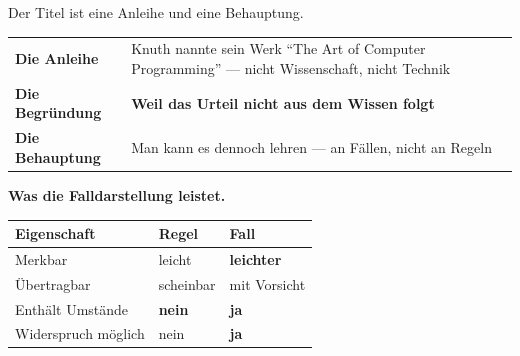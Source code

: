 \begin{geschichte}
Der Titel ist eine Anleihe und eine Behauptung.

\begin{center}
\renewcommand{\arraystretch}{1.5}
\begin{tabular}{@{}P{2.6cm}P{6.2cm}@{}}
\toprule
\textbf{Die Anleihe} & Knuth nannte sein Werk \enquote{The Art of Computer Programming} --- nicht Wissenschaft, nicht Technik\\
\textbf{Die Begründung} & \textbf{Weil das Urteil nicht aus dem Wissen folgt}\\
\textbf{Die Behauptung} & Man kann es dennoch lehren --- an Fällen, nicht an Regeln\\
\bottomrule
\end{tabular}
\end{center}

\begin{center}
\begin{minipage}{0.86\textwidth}
\end{minipage}
\end{center}

\textbf{Was die Falldarstellung leistet.}

\begin{center}
\renewcommand{\arraystretch}{1.5}
\begin{tabular}{@{}P{2.8cm}P{2.4cm}P{2.6cm}@{}}
\toprule
\textbf{Eigenschaft} & \textbf{Regel} & \textbf{Fall}\\
\midrule
Merkbar & \textcolor{gruen}{leicht} & \textcolor{gruen}{\textbf{leichter}}\\
Übertragbar & \textcolor{gruen}{scheinbar} & \textcolor{mittel}{mit Vorsicht}\\
Enthält Umstände & \textcolor{akzent}{\textbf{nein}} & \textcolor{gruen}{\textbf{ja}}\\
Widerspruch möglich & \textcolor{akzent}{nein} & \textcolor{gruen}{\textbf{ja}}\\
\bottomrule
\end{tabular}
\end{center}

\begin{center}
\begin{minipage}{0.86\textwidth}
\end{minipage}
\end{center}

\begin{center}
\end{center}
\end{geschichte}

